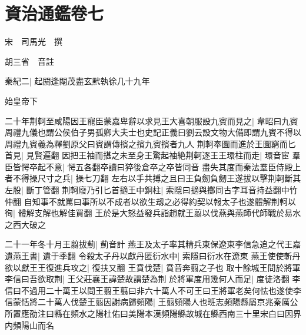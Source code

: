 \section{資治通鑑卷七}
宋　司馬光　撰

胡三省　音註

秦紀二|{
	起閼逢閹茂盡玄黓執徐几十九年}


始皇帝下

二十年荆軻至咸陽因王寵臣蒙嘉卑辭以求見王大喜朝服設九賓而見之|{
	韋昭曰九賓周禮九儀也謂公侯伯子男孤卿大夫士也史記正義曰劉云設文物大備即謂九賓不得以周禮九賓義為釋劉原父曰賓謂傳擯之擯九賓擯者九人}
荆軻奉圖而進於王圖窮而匕首見|{
	見賢遍翻}
因把王袖而揕之未至身王驚起袖絶荆軻逐王王環柱而走|{
	環音宦}
羣臣皆愕卒起不意|{
	愕五各翻卒讀曰猝後倉卒之卒皆同音}
盡失其度而秦法羣臣侍殿上者不得操尺寸之兵|{
	操七刀翻}
左右以手共搏之且曰王負劒負劒王遂拔以擊荆軻斷其左股|{
	斷丁管翻}
荆軻廢乃引匕首擿王中銅柱|{
	索隱曰擿與擲同古字耳音持益翻中竹仲翻}
自知事不就罵曰事所以不成者以欲生刼之必得約契以報太子也遂體解荆軻以徇|{
	體解支解也解佳買翻}
王於是大怒益發兵詣趙就王翦以伐燕與燕師代師戰於易水之西大破之

二十一年冬十月王翦拔薊|{
	薊音計}
燕王及太子率其精兵東保遼東李信急追之代王嘉遺燕王書|{
	遺于季翻}
令殺太子丹以獻丹匿衍水中|{
	索隱曰衍水在遼東}
燕王使使斬丹欲以獻王王復進兵攻之|{
	復扶又翻}
王賁伐楚|{
	賁音奔翦之子也}
取十餘城王問於將軍李信曰吾欲取荆|{
	王父莊襄王諱楚故謂楚為荆}
於將軍度用幾何人而足|{
	度徒洛翻}
李信曰不過用二十萬王以問王翦王翦曰非六十萬人不可王曰王將軍老矣何怯也遂使李信蒙恬將二十萬人伐楚王翦因謝病歸頻陽|{
	王翦頻陽人也班志頻陽縣屬京兆秦厲公所置應劭注曰縣在頻水之陽杜佑曰美陽本漢頻陽縣故城在縣西南三十里宋白曰因界内頻陽山而名}


